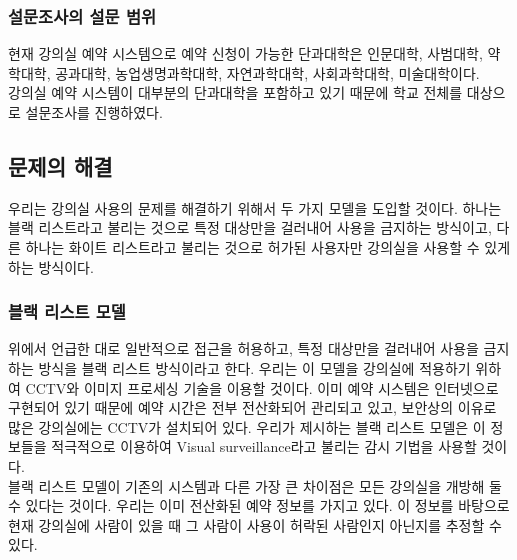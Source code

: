 \documentclass[11pt,a4paper]{article}
\begin{document}
\subsubsection{설문조사의 설문 범위}
현재 강의실 예약 시스템으로 예약 신청이 가능한 단과대학은 인문대학, 사범대학, 약학대학, 공과대학, 농업생명과학대학, 자연과학대학, 사회과학대학, 미술대학이다.\\
강의실 예약 시스템이 대부분의 단과대학을 포함하고 있기 때문에 학교 전체를 대상으로 설문조사를 진행하였다.

\subsection{문제의 해결}
우리는 강의실 사용의 문제를 해결하기 위해서 두 가지 모델을 도입할 것이다. 하나는 블랙 리스트라고 불리는 것으로 특정 대상만을 걸러내어 사용을 금지하는 방식이고, 다른 하나는 화이트 리스트라고 불리는 것으로 허가된 사용자만 강의실을 사용할 수 있게 하는 방식이다.

\subsubsection{블랙 리스트 모델}
위에서 언급한 대로 일반적으로 접근을 허용하고, 특정 대상만을 걸러내어 사용을 금지하는 방식을 블랙 리스트 방식이라고 한다. 우리는 이 모델을 강의실에 적용하기 위하여 CCTV와 이미지 프로세싱 기술을 이용할 것이다. 이미 예약 시스템은 인터넷으로 구현되어 있기 때문에 예약 시간은 전부 전산화되어 관리되고 있고, 보안상의 이유로 많은 강의실에는 CCTV가 설치되어 있다. 우리가 제시하는 블랙 리스트 모델은 이 정보들을 적극적으로 이용하여 Visual surveillance라고 불리는 감시 기법을 사용할 것이다.\\
블랙 리스트 모델이 기존의 시스템과 다른 가장 큰 차이점은 모든 강의실을 개방해 둘 수 있다는 것이다. 우리는 이미 전산화된 예약 정보를 가지고 있다. 이 정보를 바탕으로 현재 강의실에 사람이 있을 때 그 사람이 사용이 허락된 사람인지 아닌지를 추정할 수 있다.
\end{document}
